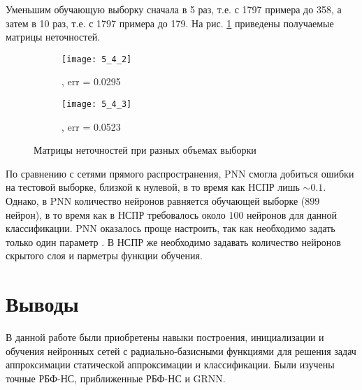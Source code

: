 Уменьшим обучающую выборку сначала в 5 раз, т.е. с 1797 примера до 358, а затем в 10 раз, т.е. с 1797 примера до 179. На рис. \ref{fig:5_4_2} приведены получаемые матрицы неточностей.
\begin{figure}[H]
\begin{center}
	\begin{subfigure}{0.49\textwidth}
		\texttt{[image: 5\_4\_2]}
		\caption{, err = 0.0295}
	\end{subfigure}
	\begin{subfigure}{0.49\textwidth}
		\texttt{[image: 5\_4\_3]}
		\caption{, err = 0.0523}
	\end{subfigure}
	\caption{Матрицы неточностей при разных объемах выборки}
	\label{fig:5_4_2}
\end{center}
\end{figure}

По сравнению с сетями прямого распространения, PNN смогла добиться ошибки на тестовой выборке, близкой к нулевой, в то время как НСПР лишь $\sim 0.1$. Однако, в PNN количество нейронов равняется обучающей выборке ($899$ нейрон), в то время как в НСПР требовалось около $100$ нейронов для данной классификации. PNN оказалось проще настроить, так как необходимо задать только один параметр . В НСПР же необходимо задавать количество нейронов скрытого слоя и парметры функции обучения.

\section{Выводы}

В данной работе были приобретены навыки построения, инициализации и обучения нейронных сетей с радиально-базисными функциями для решения задач аппроксимации статической аппроксимации и классификации. Были изучены точные РБФ-НС, приближенные РБФ-НС и GRNN.

